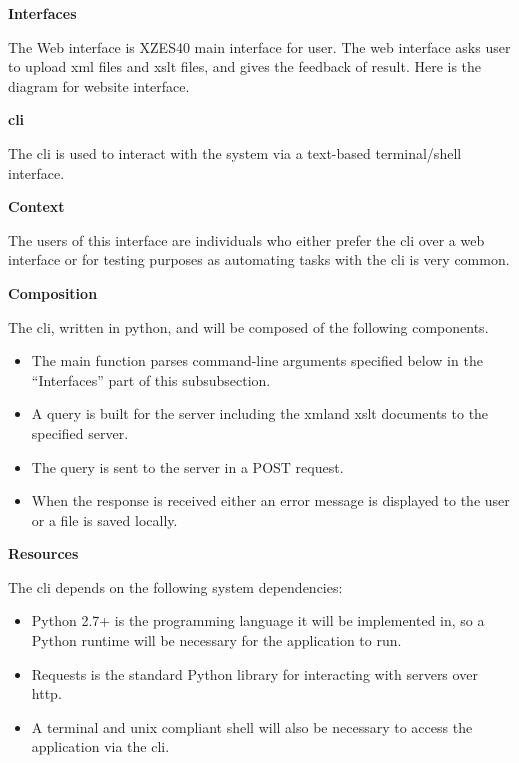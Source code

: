 \textbf{Interfaces}

The Web interface is XZES40 main interface for user.
The web interface asks user to upload \gls{xml} files and \gls{xslt} files, and gives the feedback of result.
Here is the diagram for website interface.


\textbf{\gls{cli}}
\label{cli}

The \gls{cli} is used to interact with the system via a text-based terminal/shell interface.

\textbf{Context}

The users of this interface are individuals who either prefer the \gls{cli} over a web interface or for testing purposes as automating tasks with the \gls{cli} is very common.

\textbf{Composition}

The \gls{cli}, written in \gls{python}, and will be composed of the following components.

\begin{itemize}
  \item The main function parses command-line arguments specified below in the ``Interfaces'' part of this subsubsection.
    \item A query is built for the server including the \gls{xml}and \gls{xslt} documents to the specified server.
    \item The query is sent to the server in a POST request.
    \item When the response is received either an error message is displayed to the user or a file is saved locally.
\end{itemize}

\textbf{Resources}

The \gls{cli} depends on the following system dependencies:

\begin{itemize}
  \item {Python 2.7+} is the programming language it will be implemented in, so a Python runtime will be necessary for the application to run.
    \item {Requests} is the standard Python library for interacting with servers over \gls{http}.
    \item {A terminal and \gls{unix} compliant shell} will also be necessary to access the application via the \gls{cli}.
\end{itemize}

